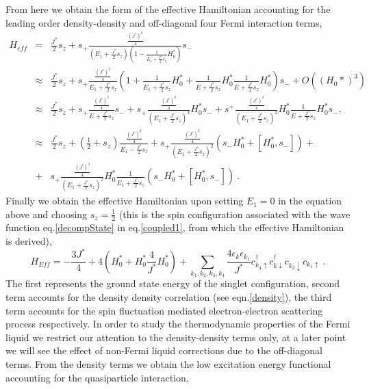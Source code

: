 \documentclass[aps,prb,preprint,groupedaddress]{revtex4-2}
\begin{document}
From here we obtain the form of the effective Hamiltonian accounting for the leading order density-density and off-diagonal four Fermi interaction terms,
\begin{eqnarray}
H_{eff}&=&\frac{J^{*}}{2}s_{z}+s_{+}\frac{\frac{(J^{*})^{2}}{4}}{(E_{1}+\frac{J^{*}}{2}s_{z})(1-\frac{1}{E_{1}+\frac{J^{*}}{2}s_{z}}H^{*}_{0})}s_{-}\nonumber\\
&\approx &\frac{J^{*}}{2}s_{z}+s_{+}\frac{\frac{(J^{*})^{2}}{4}}{E_{1}+\frac{J^{*}}{2}s_{z}}(1+\frac{1}{E_{1}+\frac{J^{*}}{2}s_{z}}H^{*}_{0}+\frac{1}{E+\frac{J^{*}}{2}s_{z}}H^{*}_{0}\frac{1}{E+\frac{J^{*}}{2}s_{z}}H^{*}_{0})s_{-}+O((H_{0}*)^{3})\nonumber\\
&\approx &\frac{J^{*}}{2}s_{z}+s_{+}\frac{\frac{(J^{*})^{2}}{4}}{E+\frac{J^{*}}{2}s_{z}}  s_{-}+ s_{+}\frac{\frac{(J^{*})^{2}}{4}}{(E_{1}+\frac{J^{*}}{2}s_{z})^{2}}H^{*}_{0}s_{-}+s^{+}\frac{\frac{(J^{*})^{2}}{4}}{(E_{1}+\frac{J^{*}}{2}s_{z})^{2}}H^{*}_{0}\frac{1}{E+\frac{J^{*}}{2}s_{z}}H^{*}_{0}s_{-}, ~~~~~\nonumber\\
&\approx &\frac{J^{*}}{2}s_{z}+(\frac{1}{2}+s_{z})\frac{\frac{(J^{*})^{2}}{4}}{E_{1}-\frac{J^{*}}{2}s_{z}}+s_{+}\frac{\frac{(J^{*})^{2}}{4}}{(E_{1}+\frac{J^{*}}{2}s_{z})^{2}}(s_{-}H^{*}_{0}+[H^{*}_{0},s_{-}])+\nonumber\\
&+&s_{+}\frac{\frac{(J^{*})^{2}}{4}}{(E_{1}+\frac{J^{*}}{2}s_{z})^{2}}H^{*}_{0}\frac{1}{E_{1}+\frac{J^{*}}{2}s_{z}}(s_{-}H^{*}_{0}+[H^{*}_{0},s_{-}])~.
\end{eqnarray}
Finally we obtain the effective Hamiltonian upon setting $E_{1}=0$ in the equation above and choosing $s_{z}=\frac{1}{2}$ (this is the spin configuration associated with the wave function eq.\eqref{decompState} in eq.\eqref{coupled1}, from which the effective Hamiltonian is derived),
\begin{equation}
H_{Eff}=-\frac{3J^{*}}{4}+4(H^{*}_{0}+H^{*}_{0}\frac{4}{J^{*}}H^{*}_{0})+\sum_{k_{1},k_{2},k_{3},k_{4}}\frac{4\epsilon_{k}\epsilon_{k_{1}}}{J^{*}}c^{\dagger}_{k_{4}\uparrow}c^{\dagger}_{k\downarrow}c_{k_{2}\downarrow}c_{k_{1}\uparrow}~.\label{eff_Ham_Kondo}
\end{equation}
The first represents the ground state energy of the singlet configuration, second term accounts for the density density correlation (see eqn.\eqref{density}), the third term accounts for the spin fluctuation mediated electron-electron scattering process respectively.
\pin
In order to study the thermodynamic properties of the Fermi liquid we restrict our attention to the density-density terms only, at a later point we will see the effect of non-Fermi liquid corrections due to the off-diagonal terms. From the density terms we obtain the low excitation energy functional accounting for the quasiparticle interaction,
\end{document}
